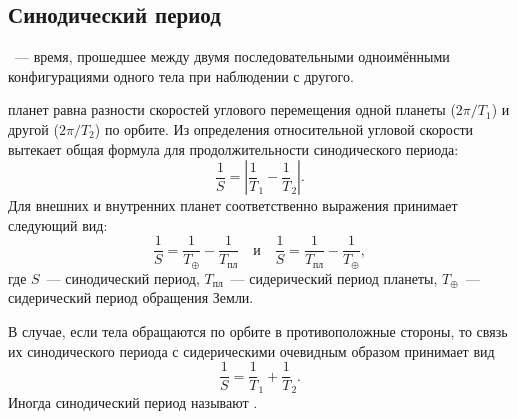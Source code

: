 \subsection{Синодический период}

~--- время, прошедшее между двумя 
последовательными одноимёнными конфигурациями одного тела при наблюдении с другого.

 планет равна 
разности скоростей углового перемещения одной планеты ($2\pi/T_1$) и другой ($2\pi/T_2 $) по орбите. Из определения относительной угловой скорости вытекает общая формула для продолжительности синодического периода: 
\begin{equation}
\frac1S=\left| \frac1T_1-\frac1T_2 \right|.
\end{equation}
Для внешних и внутренних планет соответственно выражения принимает следующий вид: 
\begin{equation} \frac{1}{S} = \frac{1}{T_\oplus} - \frac{1}{T_\text{пл}} \quad \text{и} \quad \frac{1}{S} = \frac{1}{T_\text{пл}} - \frac{1}{T_\oplus},
\end{equation}
где $S$~--- синодический период, $T_\text{пл}$~--- сидерический период планеты, $T_\oplus$~--- сидерический период обращения Земли.

В случае, если тела обращаются по орбите в противоположные стороны, то связь 
их синодического периода с сидерическими очевидным образом принимает вид
\begin{equation}
\frac1S=\frac1T_1+\frac1T_2.
\end{equation}
Иногда синодический период называют . 
